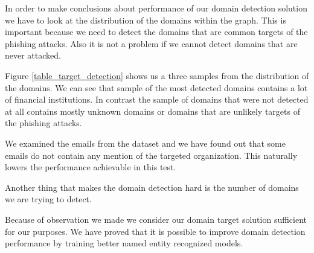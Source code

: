 \documentclass[thesis=B,english]{FITthesis}[2012/10/20]
\begin{document}

\par In order to make conclusions about performance of our domain detection solution we have to look at the distribution of the domains within the graph. This is important because we need to detect the domains that are common targets of the phishing attacks. Also it is not a problem if we cannot detect domains that are never attacked.
\par Figure \ref{table_target_detection} shows us a three samples from the distribution of the domains. 
We can see that sample of the most detected domains contains a lot of financial institutions. In contrast the sample of domains that were not detected at all contains mostly unknown domains or domains that are unlikely targets of the phishing attacks.

\par We examined the emails from the dataset and we have found out that some emails do not contain any mention of the targeted organization. This naturally lowers the performance achievable in this test.
\par Another thing that makes the domain detection hard is the number of domains we are trying to detect.

\par Because of observation we made we consider our domain target solution sufficient for our purposes.
We have proved that it is possible to improve domain detection performance by training better named entity recognized models.
\end{document}
